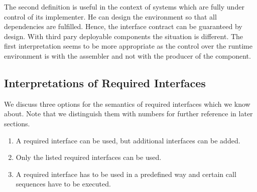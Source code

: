 The second definition is useful in the context of systems which are fully under control of its implementer. He can design the environment so that all dependencies are fulfilled. Hence, the interface contract can be guaranteed by design. With third pary deployable components the situation is different. The first interpretation seems to be more appropriate as the control over the runtime environment is with the assembler and not with the producer of the component.

\subsection{Interpretations of Required Interfaces}
We discuss three options for the semantics of required interfaces which we know about. Note that we distinguish them with numbers for further reference in later sections.

\begin{enumerate}
\item	A required interface can be used, but additional interfaces can be added.
\item	Only the listed required interfaces can be used.
\item	A required interface has to be used in a predefined way and certain call sequences have to be executed. 
\end{enumerate}

